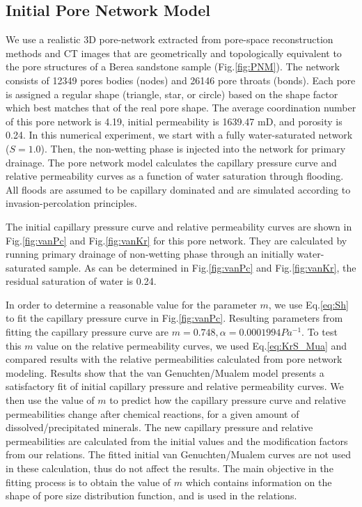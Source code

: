 \documentclass[preprint,12pt,authoryear]{elsarticle}
\begin{document}
\subsection{Initial Pore Network Model}
We use a realistic 3D pore-network extracted from pore-space reconstruction methods and CT images that are geometrically and topologically equivalent to the pore structures of a Berea sandstone sample (Fig.\ref{fig:PNM}). The network consists of 12349 pores bodies (nodes) and 26146 pore throats (bonds). Each pore is assigned a regular shape (triangle, star, or circle) based on the shape factor which best matches that of the real pore shape. The average coordination number of this pore network is 4.19, initial permeability is 1639.47 mD, and porosity is 0.24. In this numerical experiment, we start with a fully water-saturated network ($S=1.0$). Then, the non-wetting phase is injected into the network for primary drainage. The pore network model calculates the capillary pressure curve and relative permeability curves as a function of water saturation through flooding. All floods are assumed to be capillary dominated and are simulated according to invasion-percolation principles.

The initial capillary pressure curve and relative permeability curves are shown in Fig.\ref{fig:vanPc} and Fig.\ref{fig:vanKr} for this pore network. They are calculated by running primary drainage of non-wetting phase through an initially water-saturated sample. As can be determined in Fig.\ref{fig:vanPc} and Fig.\ref{fig:vanKr}, the residual saturation of water is 0.24.

In order to determine a reasonable value for the parameter $m$, we use Eq.\ref{eq:Sh} to fit the capillary pressure curve in Fig.\ref{fig:vanPc}. Resulting parameters from fitting the capillary pressure curve are $m=0.748, \alpha=0.0001994 Pa^{-1}$. To test this $m$ value on the relative permeability curves, we used Eq.\ref{eq:KrS_Mua} and compared results with the relative permeabilities calculated from pore network modeling. Results show that the van Genuchten/Mualem model presents a satisfactory fit of initial capillary pressure and relative permeability curves. We then use the value of $m$ to predict how the capillary pressure curve and relative permeabilities change after chemical reactions, for a given amount of dissolved/precipitated minerals. The new capillary pressure and relative permeabilities are calculated from the initial values and the modification factors from our relations. The fitted initial van Genuchten/Mualem curves are not used in these calculation, thus do not affect the results. The main objective in the fitting process is to obtain the value of $m$ which contains information on the shape of pore size distribution function, and is used in the relations. 
\end{document}
